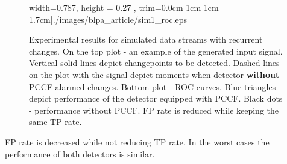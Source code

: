 \begin{figure}[!htb]
\begin{minipage}{0.5\textwidth}
{            width=0.787\textwidth,
            height = 0.27 \textheight,
            trim={0.0cm 1cm 1cm 1.7cm}]{./images/blpa_article/sim1_roc.eps}
            }
        \caption{
            Experimental results for simulated data streams with recurrent changes.
            On the top plot - an example of the generated input signal.
            Vertical solid lines depict changepoints to be detected. 
            Dashed lines on the plot with the signal depict moments when detector \textbf{without} PCCF alarmed changes.
            Bottom plot - ROC curves. 
            Blue triangles depict performance of the detector equipped with PCCF.
            Black dots - performance without PCCF.
            FP rate is reduced while keeping the same TP rate.
            }
            \label{fig:results1}
    \end{minipage}
\end{figure}
FP rate is decreased while not reducing TP rate.
In the worst cases the performance of both detectors is similar.

